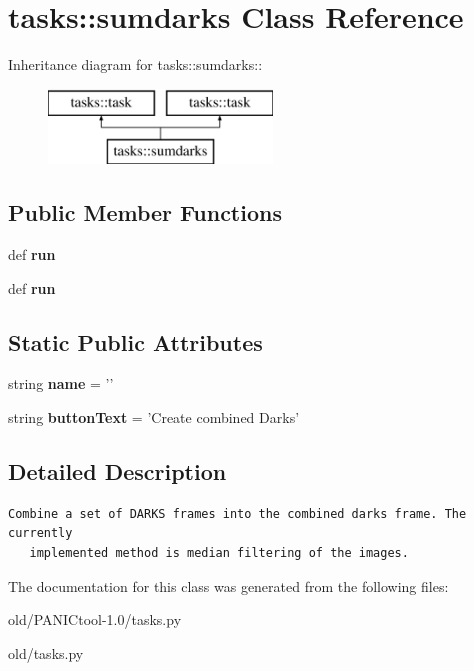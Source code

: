 \section{tasks::sumdarks Class Reference}
\label{classtasks_1_1sumdarks}
Inheritance diagram for tasks::sumdarks::\begin{figure}[H]
\begin{center}
\leavevmode
\includegraphics[height=2cm]{classtasks_1_1sumdarks}
\end{center}
\end{figure}
\subsection*{Public Member Functions}
\begin{CompactItemize}
\item 
def \textbf{run}\label{classtasks_1_1sumdarks_0980fff288b35b209f8e661d8c37ec94}

\item 
def \textbf{run}\label{classtasks_1_1sumdarks_0980fff288b35b209f8e661d8c37ec94}

\end{CompactItemize}
\subsection*{Static Public Attributes}
\begin{CompactItemize}
\item 
string \textbf{name} = '{\bfsumdarks}'\label{classtasks_1_1sumdarks_cf155e58f65ea1773b160129c8fe08e1}

\item 
string \textbf{button\-Text} = 'Create combined Darks'\label{classtasks_1_1sumdarks_f5165a7efe16382f349fc701a344c722}

\end{CompactItemize}


\subsection{Detailed Description}


\footnotesize\begin{verbatim}Combine a set of DARKS frames into the combined darks frame. The currently
   implemented method is median filtering of the images.
\end{verbatim}
\normalsize
 



The documentation for this class was generated from the following files:\begin{CompactItemize}
\item 
old/PANICtool-1.0/tasks.py\item 
old/tasks.py\end{CompactItemize}
